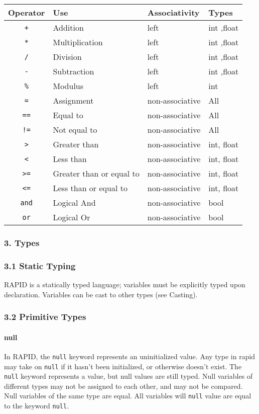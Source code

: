 \begin{longtable}[c]{@{}clll@{}}
\toprule
Operator & Use & Associativity & Types\tabularnewline
\midrule
\endhead
\texttt{+} & Addition & left & int ,float\tabularnewline
\texttt{*} & Multiplication & left & int ,float\tabularnewline
\texttt{/} & Division & left & int ,float\tabularnewline
\texttt{-} & Subtraction & left & int ,float\tabularnewline
\texttt{\%} & Modulus & left & int\tabularnewline
\texttt{=} & Assignment & non-associative & All\tabularnewline
\texttt{==} & Equal to & non-associative & All\tabularnewline
\texttt{!=} & Not equal to & non-associative & All\tabularnewline
\texttt{\textgreater{}} & Greater than & non-associative & int,
float\tabularnewline
\texttt{\textless{}} & Less than & non-associative & int,
float\tabularnewline
\texttt{\textgreater{}=} & Greater than or equal to & non-associative &
int, float\tabularnewline
\texttt{\textless{}=} & Less than or equal to & non-associative & int,
float\tabularnewline
\texttt{and} & Logical And & non-associative & bool\tabularnewline
\texttt{or} & Logical Or & non-associative & bool\tabularnewline
\bottomrule
\end{longtable}

\subsubsection*{3. Types}\label{types}

\subsubsection*{3.1 Static Typing}\label{static-typing}

RAPID is a statically typed language; variables must be explicitly typed
upon declaration. Variables can be cast to other types (see Casting).

\subsubsection*{3.2 Primitive Types}\label{primitive-types}

\paragraph{null}\label{null}

In RAPID, the \texttt{null} keyword represents an uninitialized value.
Any type in rapid may take on \texttt{null} if it hasn't been
initialized, or otherwise doesn't exist. The \texttt{null} keyword
represents a value, but null values are still typed. Null variables of
different types may not be assigned to each other, and may not be
compared. Null variables of the same type are equal. All variables will
\texttt{null} value are equal to the keyword \texttt{null}.

